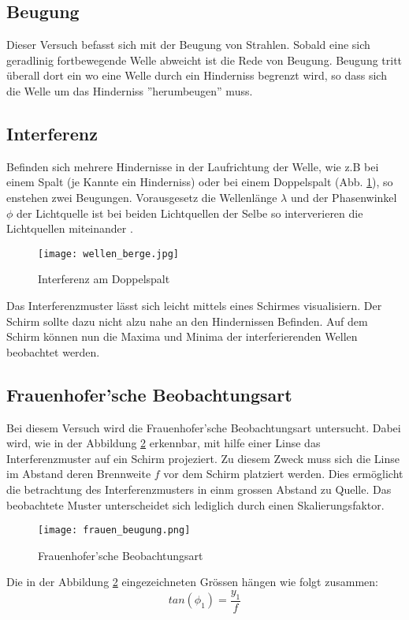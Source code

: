 \subsection{Beugung}
Dieser Versuch befasst sich mit der Beugung von Strahlen. Sobald eine sich geradlinig fortbewegende Welle abweicht ist die Rede von Beugung. Beugung tritt überall dort ein wo eine Welle durch ein Hinderniss begrenzt wird, so dass sich die Welle um das Hinderniss ''herumbeugen'' muss.

\subsection{Interferenz}

Befinden sich mehrere Hindernisse in der Laufrichtung der Welle, wie z.B bei einem Spalt (je Kannte ein Hinderniss) oder bei einem Doppelspalt (Abb. \ref{fig:wellen}), so enstehen zwei Beugungen. Vorausgesetz die Wellenlänge $\lambda$ und der Phasenwinkel $\phi$ der Lichtquelle ist bei beiden Lichtquellen der Selbe so interverieren die Lichtquellen miteinander \cite{FHNWBEUGUNG}.
\begin{figure}[htb]
\texttt{[image: wellen\_berge.jpg]}
\caption{Interferenz am Doppelspalt \cite{LERN}} %
\label{fig:wellen}
\end{figure}
Das Interferenzmuster lässt sich leicht mittels eines Schirmes visualisiern. Der Schirm sollte dazu nicht alzu nahe an den Hindernissen Befinden. Auf dem Schirm können nun die Maxima und Minima der interferierenden Wellen beobachtet werden.

\newpage
\subsection{Frauenhofer'sche Beobachtungsart}

Bei diesem Versuch wird die Frauenhofer'sche Beobachtungsart untersucht. Dabei wird, wie in der Abbildung \ref{fig:Frauenhofer} erkennbar, mit hilfe einer Linse das Interferenzmuster auf ein Schirm projeziert. Zu diesem Zweck muss sich die Linse im Abstand deren Brennweite $f$ vor dem Schirm platziert werden. Dies ermöglicht die betrachtung des Interferenzmusters in einm grossen Abstand zu Quelle. Das beobachtete Muster unterscheidet sich lediglich durch einen Skalierungsfaktor.
\begin{figure}[htb]
\texttt{[image: frauen\_beugung.png]}
\caption{Frauenhofer'sche Beobachtungsart \cite{FHNWO9}} %
\label{fig:Frauenhofer}
\end{figure}
\newline
Die in der Abbildung \ref{fig:Frauenhofer} eingezeichneten Grössen hängen wie folgt zusammen:\\

\begin{equation}
tan({\phi}_{1}) = \frac{y_1}{f}
\label{eq:frauen}
\end{equation}

